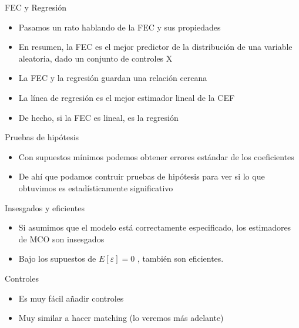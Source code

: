 \documentclass[
  ignorenonframetext,
]{beamer}
\providecommand{\tightlist}{%
  \setlength{\itemsep}{0pt}\setlength{\parskip}{0pt}}
\begin{document}
\begin{frame}{FEC y Regresión}
\protect\hypertarget{fec-y-regresiuxf3n}{}
\begin{itemize}
\tightlist
\item
  Pasamos un rato hablando de la FEC y sus propiedades
\item
  En resumen, la FEC es el mejor predictor de la distribución de una
  variable aleatoria, dado un conjunto de controles X
\item
  La FEC y la regresión guardan una relación cercana
\item
  La línea de regresión es el mejor estimador lineal de la CEF
\item
  De hecho, si la FEC es lineal, es la regresión
\end{itemize}
\end{frame}

\begin{frame}{Pruebas de hipótesis}
\protect\hypertarget{pruebas-de-hipuxf3tesis}{}
\begin{itemize}
\tightlist
\item
  Con supuestos mínimos podemos obtener errores estándar de los
  coeficientes
\item
  De ahí que podamos contruir pruebas de hipótesis para ver si lo que
  obtuvimos es estadísticamente significativo
\end{itemize}
\end{frame}

\begin{frame}{Insesgados y eficientes}
\protect\hypertarget{insesgados-y-eficientes}{}
\begin{itemize}
\tightlist
\item
  Si asumimos que el modelo está correctamente especificado, los
  estimadores de MCO son insesgados
\item
  Bajo los supuestos de \(E[\varepsilon]=0\) , también son eficientes.
\end{itemize}
\end{frame}

\begin{frame}{Controles}
\protect\hypertarget{controles}{}
\begin{itemize}
\tightlist
\item
  Es muy fácil añadir controles
\item
  Muy similar a hacer matching (lo veremos más adelante)
\end{itemize}
\end{frame}
\end{document}
